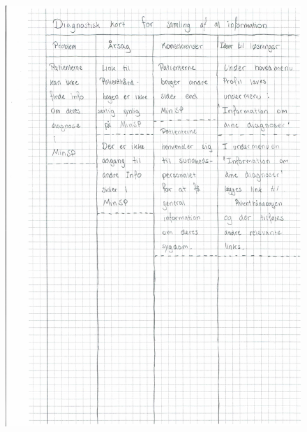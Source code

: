 \begin{figure}[H]
	\centering
	\includegraphics[angle=0, height=1.05\textheight]{Materials/DV_Kort3.pdf}
	\label{fig:DVkort3}
\end{figure}
